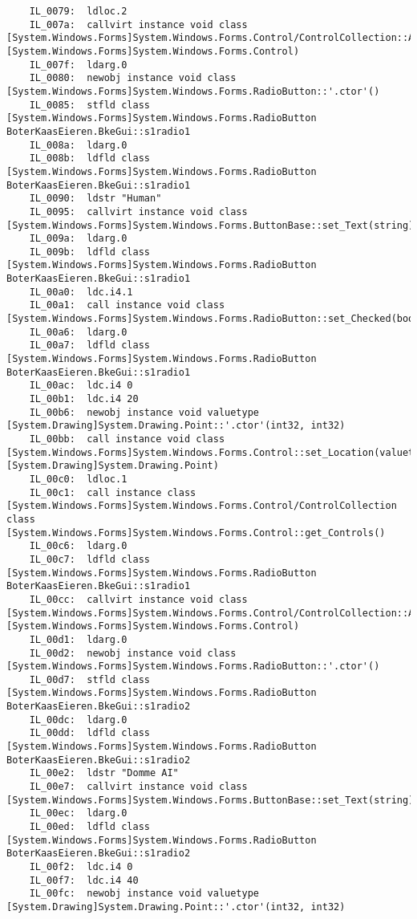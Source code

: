 \begin{lstlisting}
	IL_0079:  ldloc.2 
	IL_007a:  callvirt instance void class [System.Windows.Forms]System.Windows.Forms.Control/ControlCollection::Add(class [System.Windows.Forms]System.Windows.Forms.Control)
	IL_007f:  ldarg.0 
	IL_0080:  newobj instance void class [System.Windows.Forms]System.Windows.Forms.RadioButton::'.ctor'()
	IL_0085:  stfld class [System.Windows.Forms]System.Windows.Forms.RadioButton BoterKaasEieren.BkeGui::s1radio1
	IL_008a:  ldarg.0 
	IL_008b:  ldfld class [System.Windows.Forms]System.Windows.Forms.RadioButton BoterKaasEieren.BkeGui::s1radio1
	IL_0090:  ldstr "Human"
	IL_0095:  callvirt instance void class [System.Windows.Forms]System.Windows.Forms.ButtonBase::set_Text(string)
	IL_009a:  ldarg.0 
	IL_009b:  ldfld class [System.Windows.Forms]System.Windows.Forms.RadioButton BoterKaasEieren.BkeGui::s1radio1
	IL_00a0:  ldc.i4.1 
	IL_00a1:  call instance void class [System.Windows.Forms]System.Windows.Forms.RadioButton::set_Checked(bool)
	IL_00a6:  ldarg.0 
	IL_00a7:  ldfld class [System.Windows.Forms]System.Windows.Forms.RadioButton BoterKaasEieren.BkeGui::s1radio1
	IL_00ac:  ldc.i4 0
	IL_00b1:  ldc.i4 20
	IL_00b6:  newobj instance void valuetype [System.Drawing]System.Drawing.Point::'.ctor'(int32, int32)
	IL_00bb:  call instance void class [System.Windows.Forms]System.Windows.Forms.Control::set_Location(valuetype [System.Drawing]System.Drawing.Point)
	IL_00c0:  ldloc.1 
	IL_00c1:  call instance class [System.Windows.Forms]System.Windows.Forms.Control/ControlCollection class [System.Windows.Forms]System.Windows.Forms.Control::get_Controls()
	IL_00c6:  ldarg.0 
	IL_00c7:  ldfld class [System.Windows.Forms]System.Windows.Forms.RadioButton BoterKaasEieren.BkeGui::s1radio1
	IL_00cc:  callvirt instance void class [System.Windows.Forms]System.Windows.Forms.Control/ControlCollection::Add(class [System.Windows.Forms]System.Windows.Forms.Control)
	IL_00d1:  ldarg.0 
	IL_00d2:  newobj instance void class [System.Windows.Forms]System.Windows.Forms.RadioButton::'.ctor'()
	IL_00d7:  stfld class [System.Windows.Forms]System.Windows.Forms.RadioButton BoterKaasEieren.BkeGui::s1radio2
	IL_00dc:  ldarg.0 
	IL_00dd:  ldfld class [System.Windows.Forms]System.Windows.Forms.RadioButton BoterKaasEieren.BkeGui::s1radio2
	IL_00e2:  ldstr "Domme AI"
	IL_00e7:  callvirt instance void class [System.Windows.Forms]System.Windows.Forms.ButtonBase::set_Text(string)
	IL_00ec:  ldarg.0 
	IL_00ed:  ldfld class [System.Windows.Forms]System.Windows.Forms.RadioButton BoterKaasEieren.BkeGui::s1radio2
	IL_00f2:  ldc.i4 0
	IL_00f7:  ldc.i4 40
	IL_00fc:  newobj instance void valuetype [System.Drawing]System.Drawing.Point::'.ctor'(int32, int32)

\end{lstlisting}
